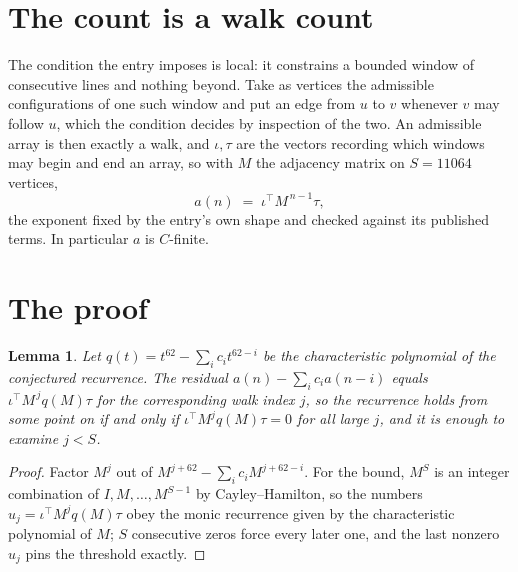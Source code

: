\documentclass[11pt,a4paper]{article}
\theoremstyle{plain}
\newtheorem{lemma}[theorem]{Lemma}
\theoremstyle{definition}
\begin{document}
\section{The count is a walk count}

The condition the entry imposes is local: it constrains a bounded window of consecutive lines and nothing beyond. Take as vertices the admissible configurations of one such window and put an edge from $u$ to $v$ whenever $v$ may follow $u$, which the condition decides by inspection of the two.
An admissible array is then exactly a walk, and $\iota,\tau$ are the vectors recording which windows may begin and end an array, so with $M$ the adjacency matrix on $S=11064$ vertices,
\[
a(n)\;=\;\iota^{\!\top}M^{\,n-1}\tau ,
\]
the exponent fixed by the entry's own shape and checked against its published terms. In
particular $a$ is $C$-finite.

\section{The proof}

\begin{lemma}\label{lem:crit}
Let $q(t)=t^{62}-\sum_i c_it^{62-i}$ be the characteristic polynomial of the
conjectured recurrence. The residual $a(n)-\sum_ic_ia(n-i)$ equals
$\iota^{\!\top}M^{\,j}q(M)\tau$ for the corresponding walk index $j$, so the recurrence
holds from some point on if and only if $\iota^{\!\top}M^{j}q(M)\tau=0$ for all large $j$,
and it is enough to examine $j<S$.
\end{lemma}

\begin{proof}
Factor $M^{j}$ out of $M^{j+62}-\sum_ic_iM^{j+62-i}$. For the bound, $M^{S}$
is an integer combination of $I,M,\dots,M^{S-1}$ by Cayley--Hamilton, so the numbers
$u_j=\iota^{\!\top}M^{j}q(M)\tau$ obey the monic recurrence given by the characteristic
polynomial of $M$; $S$ consecutive zeros force every later one, and the last nonzero $u_j$
pins the threshold exactly.
\end{proof}
\end{document}
